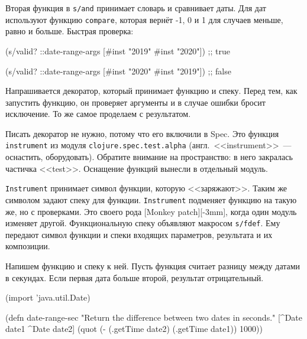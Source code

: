 
Вторая функция в \verb|s/and| принимает словарь и сравнивает даты. Для дат
используют функцию \verb|compare|, которая вернёт -1, 0 и 1 для случаев
меньше, равно и больше. Быстрая проверка:

\begin{english}
  \begin{clojure}
(s/valid? ::date-range-args
          [#inst "2019" #inst "2020"]) ;; true

(s/valid? ::date-range-args
          [#inst "2020" #inst "2019"]) ;; false
  \end{clojure}
\end{english}


Напрашивается декоратор, который принимает функцию и спеку. Перед тем, как
запустить функцию, он проверяет аргументы и в случае ошибки бросит исключение. То
же самое проделаем с результатом.


Писать декоратор не нужно, потому что его включили в Spec. Это функция
\verb|instrument| из модуля \verb|clojure.spec.test.alpha|
(англ.~<<instrument>>~--- оснастить, оборудовать). Обратите внимание на пространство:
в него закралась частичка <<test>>. Оснащение функций вынесли в отдельный
модуль.


\verb|Instrument| принимает символ функции, которую <<заряжают>>. Таким же
символом задают спеку для функции. \verb|Instrument| подменяет функцию на
такую же, но с проверками. Это своего рода [Monkey patch][-3mm], когда один модуль изменяет другой. Функциональную спеку объявляют макросом \verb|s/fdef|.
Ему передают символ функции и спеки входящих параметров, результата и их композиции.


Напишем функцию и спеку к ней. Пусть функция считает разницу между датами в
секундах. Если первая дата больше второй, результат отрицательный.

\begin{english}
  \begin{clojure}
(import 'java.util.Date)

(defn date-range-sec
  "Return the difference between two dates in seconds."
  [^Date date1 ^Date date2]
  (quot (- (.getTime date2)
           (.getTime date1))
        1000))
  \end{clojure}
\end{english}

